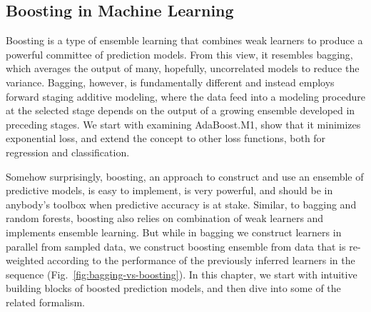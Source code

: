 \begin{refsection}
\chapter{Boosting in Machine Learning}

\begin{summary}
Boosting is a type of ensemble learning that combines weak learners to produce a powerful committee of prediction models. From this view, it resembles bagging, which averages the output of many, hopefully, uncorrelated models to reduce the variance. Bagging, however, is fundamentally different and instead employs forward staging additive modeling, where the data feed into a modeling procedure at the selected stage depends on the output of a growing ensemble developed in preceding stages. We start with examining AdaBoost.M1, show that it minimizes exponential loss, and extend the concept to other loss functions, both for regression and classification.
\end{summary}

Somehow surprisingly, boosting, an approach to construct and use an ensemble of predictive models, is easy to implement, is very powerful, and should be in anybody's toolbox when predictive accuracy is at stake. Similar, to bagging and random forests, boosting also relies on combination of weak learners and implements ensemble learning. But while in bagging we construct learners in parallel from sampled data, we construct boosting ensemble from data that is re-weighted according to the performance of the previously inferred learners in the sequence (Fig.~\ref{fig:bagging-vs-boosting}). In this chapter, we start with intuitive building blocks of boosted prediction models, and then dive into some of the related formalism.


\end{refsection}
